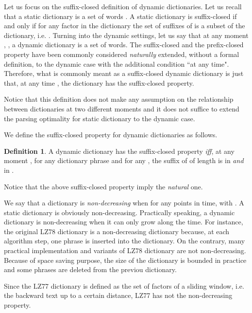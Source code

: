 \documentclass[12pt]{article}
\theoremstyle{plain}
\theoremstyle{definition}
\newtheorem{definition}{Definition}[section]
\theoremstyle{remark}
\begin{document}
Let us focus on the suffix-closed definition of dynamic dictionaries.
Let us recall that a static dictionary is a set of words .
A static dictionary is suffix-closed if and only if for any factor  in the dictionary  the set of suffixes  of  is a subset of the dictionary, i.e. .
Turning into the dynamic settings, let us say that 
at any moment , ,
a dynamic dictionary  is a set of words.
The suffix-closed and the prefix-closed property have been commonly considered \emph{naturally} extended, without a formal definition, to the dynamic case with the additional condition ``at any time".
Therefore, what is commonly meant as a suffix-closed dynamic dictionary is just that, at any time , the dictionary  has the suffix-closed property.

Notice that this definition does not make any assumption on the relationship between dictionaries at two different moments and it does not suffice to extend the parsing optimality for static dictionary to the dynamic case.

We define the suffix-closed property for dynamic dictionaries as follows.



\begin{definition} \label{prp:dynsufclosed}
A dynamic dictionary  has the suffix-closed property \textit{iff}, at any moment ,
for any dictionary phrase  and 
for any , 
the suffix  of  of length  
is in  \emph{and} in .\end{definition}

Notice that the above suffix-closed property imply the \emph{natural} one.



We say that a dictionary is \textit{non-decreasing} when  for any  points in time, with . A static dictionary is obviously non-decreasing. Practically speaking, a dynamic dictionary is non-decreasing when it can only grow along the time. 
For instance, the original LZ78 dictionary is a non-decreasing dictionary because, at each algorithm step, one phrase is inserted into the dictionary. On the contrary, 
many practical implementation and variants of LZ78 dictionary are not non-decreasing. Because of space saving purpose, the size of the dictionary is bounded in practice and some phrases are deleted from the previou dictionary. 




Since the LZ77 dictionary is defined as the set of factors of a sliding window, i.e. the backward text up to a certain distance,  LZ77 has not the non-decreasing property.
\end{document}
